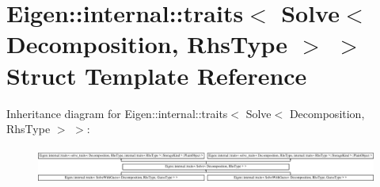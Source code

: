 \hypertarget{struct_eigen_1_1internal_1_1traits_3_01_solve_3_01_decomposition_00_01_rhs_type_01_4_01_4}{}\section{Eigen\+:\+:internal\+:\+:traits$<$ Solve$<$ Decomposition, Rhs\+Type $>$ $>$ Struct Template Reference}
\label{struct_eigen_1_1internal_1_1traits_3_01_solve_3_01_decomposition_00_01_rhs_type_01_4_01_4}
Inheritance diagram for Eigen\+:\+:internal\+:\+:traits$<$ Solve$<$ Decomposition, Rhs\+Type $>$ $>$\+:\begin{figure}[H]
\begin{center}
\leavevmode
\includegraphics[height=1.220930cm]{struct_eigen_1_1internal_1_1traits_3_01_solve_3_01_decomposition_00_01_rhs_type_01_4_01_4}
\end{center}
\end{figure}
